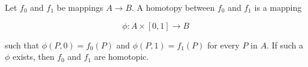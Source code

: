 Let $f_0$ and $f_1$ be mappings $A \rightarrow B$. A homotopy between $f_0$ and $f_1$ is a mapping

$$\phi: A \times [0, 1] \rightarrow B$$

such that $\phi(P, 0) = f_0(P)$ and $\phi(P, 1) = f_1(P)$ for every $P$ in $A$. If such a $\phi$ exists, then $f_0$ and $f_1$ are homotopic.
